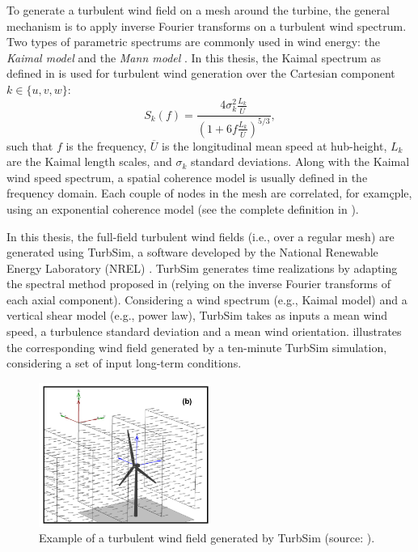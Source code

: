 To generate a turbulent wind field on a mesh around the turbine, the general mechanism is to apply inverse Fourier transforms on a turbulent wind spectrum.  
Two types of parametric spectrums are commonly used in wind energy: the \textit{Kaimal model} \citep{kaimal_1972} and the \textit{Mann model} \citep{mann_1998}. 
In this thesis, the Kaimal spectrum as defined in \cite{iec_2019} is used for turbulent wind generation over the Cartesian component $k \in \{u, v, w\}$:
\begin{equation}
    S_k(f) = \frac{4 \sigma_k^2 \frac{L_k}{\overline{U}}}{\left(1 + 6 f \frac{L_k}{\overline{U}}\right)^{5/3}},
    \label{eq:kaimal}
\end{equation} 
such that $f$ is the frequency, $\overline{U}$ is the longitudinal mean speed at hub-height, $L_k$ are the Kaimal length scales, and $\sigma_k$ standard deviations. 
Along with the Kaimal wind speed spectrum, a spatial coherence model is usually defined in the frequency domain. 
Each couple of nodes in the mesh are correlated, for examçple, using an exponential coherence model (see the complete definition in \citealp[Apepndix C]{iec_2019}).

In this thesis, the full-field turbulent wind fields (i.e., over a regular mesh) are generated using TurbSim, a software developed by the National Renewable Energy Laboratory (NREL) \citep{turbsim_2009}. 
TurbSim generates time realizations by adapting the spectral method proposed in \citet{veers_1988_sandia} (relying on the inverse Fourier transforms of each axial component).   
Considering a wind spectrum (e.g., Kaimal model) and a vertical shear model (e.g., power law), TurbSim takes as inputs a mean wind speed, a turbulence standard deviation and a mean wind orientation. 
 illustrates the corresponding wind field generated by a ten-minute TurbSim simulation, considering a set of input long-term conditions. 

\begin{figure}
    \centering
    \includegraphics[width=0.5\textwidth]{./part1/figures/turbsim.png}
    \caption{Example of a turbulent wind field generated by TurbSim (source: \citealp{turbsim_2009}).}
    \label{fig:turbsim_simu}
\end{figure}

